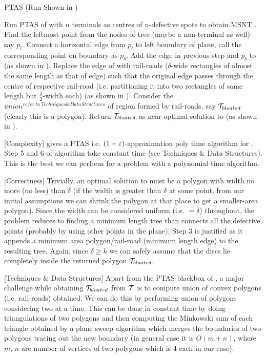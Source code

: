 \begin{algorithm}
\caption{PTAS \dmap (Run Shown in )}\label{algo2a}
\begin{algorithmic}[1]
\STATE Run PTAS of \est with $n$ terminals as centres of $n$-defective spots to obtain MSNT \TT.
\STATE Find the leftmost point from the nodes of tree (maybe a non-terminal as well) say $p_{l}$.
\STATE Connect a horizontal edge from $p_{l}$ to left boundary of plane, call the corresponding point on boundary as $p_{b}$. 
\STATE Add the edge in previous step and $p_b$ to \TT (as shown in ).
\STATE Replace the edge of \TT with rail-roads ($\delta$-wide rectangles of almost the same length as that of edge) such that the original edge passes through the centre of respective rail-road (i.e. partitioning it into two rectangles of same length but  $\frac{\delta}{2}$-width each) (as shown in ).
\STATE Consider the $union^{refer~to~Techniques \& Data Structures}$ of region formed by rail-roads, say $\mathcal T_{bloated}$ (clearly this is a polygon). Return $\mathcal T_{bloated}$ as near-optimal solution to \dmap (as shown in ).
\end {algorithmic}
\end{algorithm}

[Complexity]  gives a PTAS i.e. $(1+\varepsilon)$-approximation poly time algorithm for \dmap. Step 5 and 6 of algorithm take constant time (see Techniques $\&$ Data Structures). This is the best we can perform for a \NPH problem with a polynomial time algorithm. 

[Correctness]
Trivially, an optimal solution to \dmap must be a polygon with width no more (no less) than $\delta$ (if the width is greater than $\delta$ at some point, from our initial assumptions we can shrink the polygon at that place to get a smaller-area polygon). Since the width can be considered uniform (i.e. $=\delta$) throughout, the problem reduces to finding a minimum length tree than connects all the defective points (probably by using other points in the plane). Step 3 is justified as it appends a minimum area polygon/rail-road (minimum length edge) to the resulting tree. Again, since $\delta \geq k$ we can safely assume that the discs lie completely inside the returned polygon $\mathcal T_{bloated}$.

[Techniques $\&$ Data Structures]\label{sec:tech}
 Apart from the PTAS-blackbox of \est, a major challenge while obtaining $\mathcal T_{bloated}$ from $\mathcal T$ is to compute union of convex polygons (i.e. rail-roads) obtained. We can do this by performing union of polygons considering two at a time. This can be done in constant time by doing triangulations of two polygons and then computing the Minkowski sum of each triangle obtained by a plane sweep algorithm which merges the boundaries of two polygons tracing out the new boundary (in general case it is $O(m+n)$, where $m$, $n$ are number of vertices of two polygons which is 4 each in our case).




